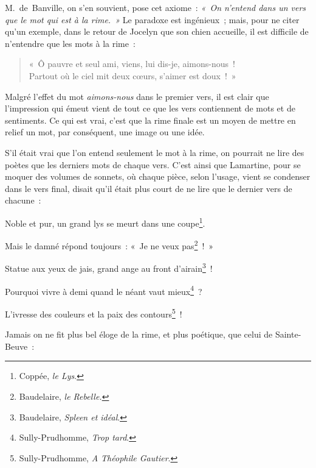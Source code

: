 \documentclass[french,twoside]{book} %
\newenvironment{quoteblock}%
  {\begin{quoting}}
  {\end{quoting}}
\newenvironment{quotebar}{%
    \def\FrameCommand{{\color{rubric!10!}\vrule width 0.5em} \hspace{0.9em}}%
    \def\OuterFrameSep{\itemsep} %
    \MakeFramed {\advance\hsize-\width \FrameRestore}
  }%
  {%
    \endMakeFramed
  }
\renewenvironment{quoteblock}%
  {%
    \savenotes
    \setstretch{0.9}
    \normalfont
    \begin{quotebar}
  }
  {%
    \end{quotebar}
    \spewnotes
  }
\begin{document}
M. de Banville, on s’en souvient, pose cet axiome : \emph{« On n’entend dans un vers que le mot qui est à la rime. »} Le paradoxe est ingénieux ; mais, pour ne citer qu’un exemple, dans le retour de Jocelyn que son chien accueille, il est difficile de n’entendre que les mots à la rime :\par


\begin{verse}
« Ô pauvre et seul ami, viens, lui dis-je, aimons-nous !\\
Partout où le ciel mit deux cœurs, s’aimer est doux ! »\\
\end{verse}

\noindent Malgré l’effet du mot \emph{aimons-nous} dans le premier vers, il est clair que l’impression qui émeut vient de tout ce que les vers contiennent de mots et de sentiments. Ce qui est vrai, c’est que la rime finale est un moyen de mettre en relief un mot, par conséquent, une image ou une idée.\par
S’il était vrai que l’on entend seulement le mot à la rime, on pourrait ne lire des poètes que les derniers mots de chaque vers. C’est ainsi que Lamartine, pour se moquer des volumes de sonnets, où chaque pièce, selon l’usage, vient se condenser dans le vers final, disait qu’il était plus court de ne lire que le dernier vers de chacune :\par

\begin{quoteblock}
 \noindent Noble et pur, un grand lys se meurt dans une coupe\footnote{ Coppée, \emph{le Lys}.}.\par
 Mais le damné répond toujours : « Je ne veux pas\footnote{ Baudelaire, \emph{le Rebelle.}} ! »\par
 Statue aux yeux de jais, grand ange au front d’airain\footnote{ Baudelaire, \emph{Spleen et idéal}.} !\par
 Pourquoi vivre à demi quand le néant vaut mieux\footnote{ Sully-Prudhomme, \emph{Trop tard}.} ?\par
 L’ivresse des couleurs et la paix des contours\footnote{ Sully-Prudhomme, \emph{A Théophile Gautier}.} !
 \end{quoteblock}

\noindent Jamais on ne fit plus bel éloge de la rime, et plus poétique, que celui de Sainte-Beuve :\par
\end{document}
